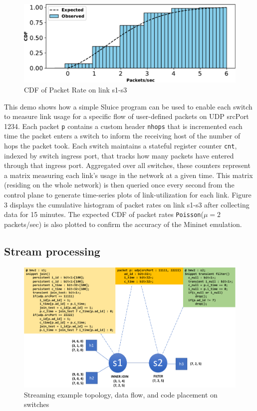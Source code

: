 \documentclass[12pt, oneside]{article}
\begin{document}
\begin{figure}
\centering
\includegraphics[width=160mm,scale=0.7]{figures/exp_obs_cdf}
\caption{CDF of Packet Rate on link s1-s3}
\end{figure}

This demo shows how a simple Sluice program can be used to enable each switch
to measure link usage for a specific flow of user-defined packets on UDP
srcPort 1234. Each packet \texttt{p} contains a custom header \texttt{nhops}
that is incremented each time the packet enters a switch to inform the
receiving host of the number of hops the packet took. Each switch maintains a
stateful register counter \texttt{cnt}, indexed by switch ingress port, that
tracks how many packets have entered through that ingress port. Aggregated over
all switches, these counters represent a matrix measuring each link's
usage in the network at a given time. This matrix (residing on the whole
network) is then queried once every second from the control plane to generate
time-series plots of link-utilization for each link. Figure 3 displays the cumulative
histogram of packet rates on link s1-s3 after collecting data for 15 minutes.
The expected CDF of packet rates \texttt{Poisson}($\mu = 2$
packets/sec) is also plotted to confirm the accuracy of the Mininet emulation.

\subsection{Stream processing}

\begin{figure}
\centering
\includegraphics[width=165mm]{figures/streaming_example}
\caption{Streaming example topology, data flow, and code placement on switches}
\end{figure}
\end{document}

